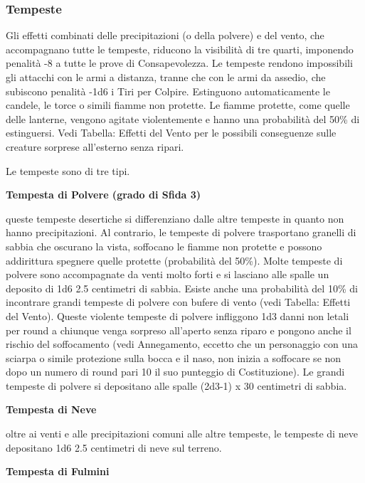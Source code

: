 \begin{multicols}{2}
\subsubsection{Tempeste}

\label{tempeste}

Gli effetti combinati delle precipitazioni (o della polvere) e del vento, che accompagnano tutte le tempeste, riducono la visibilità di tre quarti, imponendo penalità -8 a tutte le prove di Consapevolezza. Le tempeste rendono impossibili gli attacchi con le armi a distanza, tranne che con le armi da assedio, che subiscono penalità -1d6 i Tiri per Colpire.
Estinguono automaticamente le candele, le torce o simili fiamme non protette. Le fiamme protette, come quelle delle lanterne, vengono agitate violentemente e hanno una probabilità del 50\% di estinguersi. Vedi Tabella: Effetti del Vento per le possibili conseguenze sulle creature sorprese all'esterno senza ripari.

Le tempeste sono di tre tipi.

\textbf{Tempesta di Polvere (grado di Sfida 3)}

queste tempeste desertiche si differenziano dalle altre tempeste in quanto non hanno precipitazioni. Al contrario, le tempeste di polvere trasportano granelli di sabbia che oscurano la vista, soffocano le fiamme non protette e possono addirittura spegnere quelle protette (probabilità del 50\%). Molte tempeste di polvere sono accompagnate da venti molto forti e si lasciano alle spalle un deposito di 1d6 \texttimes{} 2.5 centimetri di sabbia.
Esiste anche una probabilità del 10\% di incontrare grandi tempeste di polvere con bufere di vento (vedi Tabella: Effetti del Vento). Queste violente tempeste di polvere infliggono 1d3 danni non letali per round a chiunque venga sorpreso all'aperto senza riparo e pongono anche il rischio del soffocamento (vedi Annegamento, eccetto che un personaggio con una sciarpa o simile protezione sulla bocca e il naso, non inizia a soffocare se non dopo un numero di round pari 10 \texttimes{} il suo punteggio di Costituzione). Le grandi tempeste di polvere si depositano alle spalle (2d3-1) x 30 centimetri di sabbia.

\textbf{Tempesta di Neve}

oltre ai venti e alle precipitazioni comuni alle altre tempeste, le tempeste di neve depositano 1d6 \texttimes{} 2.5 centimetri di neve sul terreno.

\textbf{Tempesta di Fulmini}


\end{multicols}
